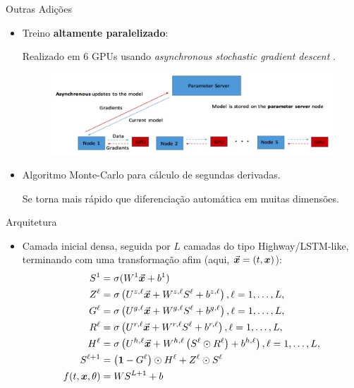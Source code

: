 \documentclass[13pt]{beamer}
\begin{document}
\begin{frame}{Outras Adições}
    \begin{itemize}
        \item<1-> Treino \textbf{altamente paralelizado}:

            Realizado em 6 GPUs usando \emph{asynchronous stochastic gradient descent} \cite{dean12}.
            \begin{figure}[htb]
                    \includegraphics[width=.8\textwidth]{../figuras/asynchronous-sgd.png}
            \end{figure}

        \item<2-> Algoritmo Monte-Carlo para cálculo de segundas derivadas.

            Se torna mais rápido que diferenciação automática em muitas dimensões.
    \end{itemize}
\end{frame}

\begin{frame}{Arquitetura}
    \begin{itemize}
        \item Camada inicial densa, seguida por \( L \) camadas do tipo Highway/LSTM-like, terminando com uma transformação afim (aqui, \( \vec{\bm{x}} = ( t, \bm{x} ) \)):
            \begin{align*}
                S^{ 1 } &= \sigma ( W^{ 1 } \vec{\bm{x}} + b^{ 1 } ) \\
                Z^{ \ell } &= \sigma \left(
                    U^{ z, \ell } \vec{\bm{x}} + W^{ z, \ell } S^{ \ell } + b^{ z, \ell }
                \right), \ell = 1, \dots, L, \\
                G^{ \ell } &= \sigma \left(
                    U^{ g, \ell } \vec{\bm{x}} + W^{ g, \ell } S^{ \ell } + b^{ g, \ell }
                \right), \ell = 1, \dots, L, \\
                R^{ \ell } &= \sigma \left(
                    U^{ r, \ell } \vec{\bm{x}} + W^{ r, \ell } S^{ \ell } + b^{ r, \ell }
                    \right), \ell = 1, \dots, L, \\
                H^{ \ell } &= \sigma \left(
                    U^{ h, \ell } \vec{\bm{x}} + W^{ h, \ell } \left(
                        S^{ \ell } \odot R^{ \ell }
                    \right) + b^{ h, \ell }
                \right), \ell = 1, \dots, L, \\
                S^{ \ell + 1 } &= \left(
                        \bm{1} - G^{ \ell }
                    \right) \odot H^{ \ell } + Z^{ \ell } \odot S^{ \ell } \\
                    f ( t, \bm{x}, \theta ) &= W S^{ L + 1 } + b
            \end{align*}
    \end{itemize}
\end{frame}
\end{document}
